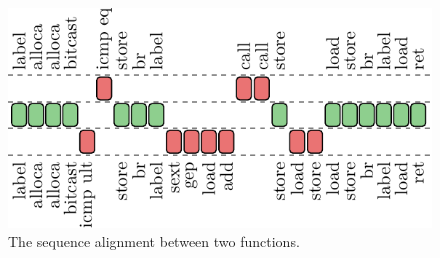 \begin{figure}[h]
  \centering
  \includegraphics[width=0.85\linewidth]{src/merge-operation/figs/opcode-align.pdf}
  \caption{The sequence alignment between two functions.}
  \label{fig:opcode-align}
\end{figure}

